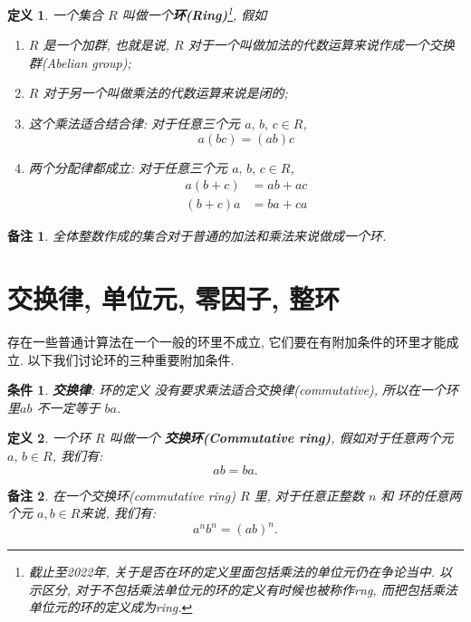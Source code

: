 \documentclass[utf8]{ctexbook}
\newtheorem{definition}{定义}[section]
\newtheorem{memo}{备注}[section]
\newtheorem{condition}{条件}[section]
\begin{document}
\begin{definition}\label{def_ring}
一个集合 $R$ 叫做一个\textbf{环(Ring)}\footnote{截止至2022年, 关于是否在环的定义里面包括乘法的单位元仍在争论当中. 以示区分, 对于不包括乘法单位元的环的定义有时候也被称作rng, 而把包括乘法单位元的环的定义成为ring.}, 假如
\begin{enumerate}
\item{$R$ 是一个加群, 也就是说, $R$ 对于一个叫做加法的代数运算来说作成一个交换群(Abelian group);}
\item{$R$ 对于另一个叫做乘法的代数运算来说是闭的;}
\item{这个乘法适合结合律: 对于任意三个元 $a, \, b, \, c \in R$,
\begin{equation}
a(bc) = (ab) c
\end{equation}
}
\item{两个分配律都成立: 对于任意三个元 $a, \, b, \, c \in R$,
\begin{align*}
a(b+c) & = ab + ac \\
(b+c)a &= ba + ca
\end{align*}
}
\end{enumerate}
\end{definition}

\begin{memo}
全体整数作成的集合对于普通的加法和乘法来说做成一个环.
\end{memo}

\section{交换律, 单位元, 零因子, 整环}

存在一些普通计算法在一个一般的环里不成立, 它们要在有附加条件的环里才能成立. 以下我们讨论环的三种重要附加条件.

\begin{condition}
\textbf{交换律}: 环的定义 没有要求乘法适合交换律(commutative), 所以在一个环里$ab$ 不一定等于 $ba$.
\end{condition}

\begin{definition}
一个环 $R$ 叫做一个 \textbf{交换环(Commutative ring)}, 假如对于任意两个元 $a,\, b \in R$, 我们有:
\begin{equation}
a b = b a .
\end{equation}
\end{definition}

\begin{memo}
在一个交换环(commutative ring) $R$ 里, 对于任意正整数 $n$ 和 环的任意两个元 $a, b \in R$来说, 我们有:
\begin{equation}
a^n b^n = (ab)^n .
\end{equation}
\end{memo}
\end{document}
